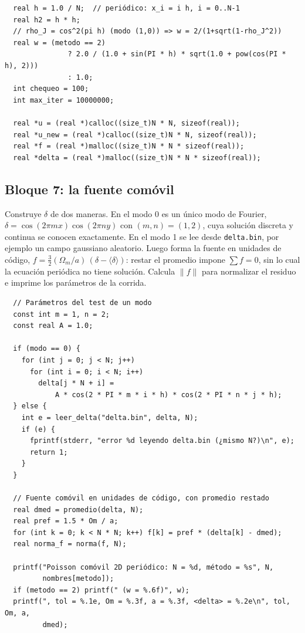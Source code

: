 \begin{appendix}
\begin{lstlisting}
  real h = 1.0 / N;  // periódico: x_i = i h, i = 0..N-1
  real h2 = h * h;
  // rho_J = cos^2(pi h) (modo (1,0)) => w = 2/(1+sqrt(1-rho_J^2))
  real w = (metodo == 2)
               ? 2.0 / (1.0 + sin(PI * h) * sqrt(1.0 + pow(cos(PI * h), 2)))
               : 1.0;
  int chequeo = 100;
  int max_iter = 10000000;

  real *u = (real *)calloc((size_t)N * N, sizeof(real));
  real *u_new = (real *)calloc((size_t)N * N, sizeof(real));
  real *f = (real *)malloc((size_t)N * N * sizeof(real));
  real *delta = (real *)malloc((size_t)N * N * sizeof(real));
\end{lstlisting}

\subsection{Bloque 7: la fuente comóvil}

Construye $\delta$ de dos maneras. En el modo 0 es un único modo de Fourier, $\delta=\cos(2\pi mx)\cos(2\pi ny)$ con $(m,n)=(1,2)$, cuya solución discreta y continua se conocen exactamente. En el modo 1 se lee desde \texttt{delta.bin}, por ejemplo un campo gaussiano aleatorio. Luego forma la fuente en unidades de código, $f=\tfrac32(\Omega_m/a)\,(\delta-\langle\delta\rangle)$: restar el promedio impone $\sum f=0$, sin lo cual la ecuación periódica no tiene solución. Calcula $\|f\|$ para normalizar el residuo e imprime los parámetros de la corrida.

\begin{lstlisting}
  // Parámetros del test de un modo
  const int m = 1, n = 2;
  const real A = 1.0;

  if (modo == 0) {
    for (int j = 0; j < N; j++)
      for (int i = 0; i < N; i++)
        delta[j * N + i] =
            A * cos(2 * PI * m * i * h) * cos(2 * PI * n * j * h);
  } else {
    int e = leer_delta("delta.bin", delta, N);
    if (e) {
      fprintf(stderr, "error %d leyendo delta.bin (¿mismo N?)\n", e);
      return 1;
    }
  }

  // Fuente comóvil en unidades de código, con promedio restado
  real dmed = promedio(delta, N);
  real pref = 1.5 * Om / a;
  for (int k = 0; k < N * N; k++) f[k] = pref * (delta[k] - dmed);
  real norma_f = norma(f, N);

  printf("Poisson comóvil 2D periódico: N = %d, método = %s", N,
         nombres[metodo]);
  if (metodo == 2) printf(" (w = %.6f)", w);
  printf(", tol = %.1e, Om = %.3f, a = %.3f, <delta> = %.2e\n", tol, Om, a,
         dmed);
\end{lstlisting}


\end{appendix}
